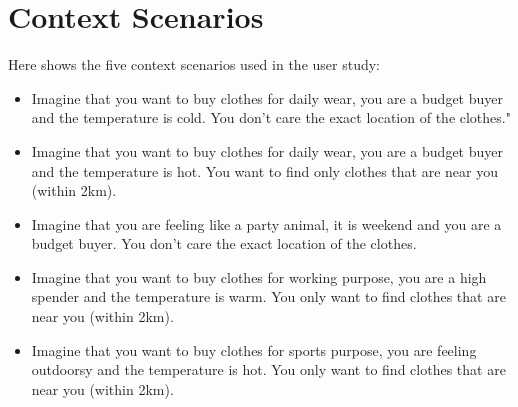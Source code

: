 \chapter{Context Scenarios} \label{appendix:cs}
Here shows the five context scenarios used in the user study: 
\begin{itemize}
\item{Imagine that you want to buy clothes for daily wear, you are a budget buyer and the temperature is cold. You don't care the exact location of the clothes."}
\item{Imagine that you want to buy clothes for daily wear, you are a budget buyer and the temperature is hot. You want to find only clothes that are near you (within 2km).}
\item{Imagine that you are feeling like a party animal, it is weekend and you are a budget buyer. You don't care the exact location of the clothes.}
\item{Imagine that you want to buy clothes for working purpose, you are a high spender and the temperature is warm. You only want to find clothes that are near you (within 2km).}
\item{Imagine that you want to buy clothes for sports purpose, you are feeling outdoorsy and the temperature is hot. You only want to find clothes that are near you (within 2km).}
\end{itemize}








